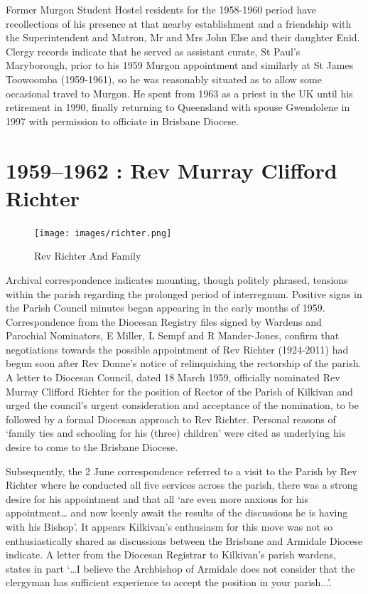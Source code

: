 Former Murgon Student Hostel residents for the 1958-1960 period have
recollections of his presence at that nearby establishment and a
friendship with the Superintendent and Matron, Mr and Mrs John Else and
their daughter Enid. Clergy records indicate that he served as assistant
curate, St Paul's Maryborough, prior to his 1959 Murgon appointment and
similarly at St James Toowoomba (1959-1961), so he was reasonably
situated as to allow some occasional travel to Murgon. He spent from
1963 as a priest in the UK until his retirement in 1990, finally
returning to Queensland with spouse Gwendolene in 1997 with permission
to officiate in Brisbane Diocese.

\printendnotes[custom]
\setcounter{endnote}{0}
\chapter{1959--1962 : Rev Murray Clifford
Richter}




\begin{figure}
\begin{center}
\texttt{[image: images/richter.png]}
\caption{Rev Richter And Family}
\end{center}
\end{figure}


Archival correspondence indicates mounting, though politely phrased,
tensions within the parish regarding the prolonged period of
interregnum. Positive signs in the Parish Council minutes began
appearing in the early months of 1959. Correspondence from the Diocesan
Registry files signed by Wardens and Parochial Nominators, E Miller, L
Sempf and R Mander-Jones, confirm that negotiations towards the possible
appointment of Rev Richter (1924-2011) had begun soon after Rev Donne's
notice of relinquishing the rectorship of the parish. A letter to
Diocesan Council, dated 18 March 1959, officially nominated Rev Murray
Clifford Richter for the position of Rector of the Parish of Kilkivan
and urged the council's urgent consideration and acceptance of the
nomination, to be followed by a formal Diocesan approach to Rev Richter.
Personal reasons of `family ties and schooling for his (three) children'
were cited as underlying his desire to come to the Brisbane Diocese.

Subsequently, the 2 June correspondence referred to a visit to the
Parish by Rev Richter where he conducted all five services across the
parish, there was a strong desire for his appointment and that all `are
even more anxious for his appointment\ldots{} and now keenly await the
results of the discussions he is having with his Bishop'. It appears
Kilkivan's enthusiasm for this move was not so enthusiastically shared
as discussions between the Brisbane and Armidale Diocese indicate. A
letter from the Diocesan Registrar to Kilkivan's parish wardens, states
in part `\ldots I believe the Archbishop of Armidale does not consider
that the clergyman has sufficient experience to accept the position in
your parish...'.


